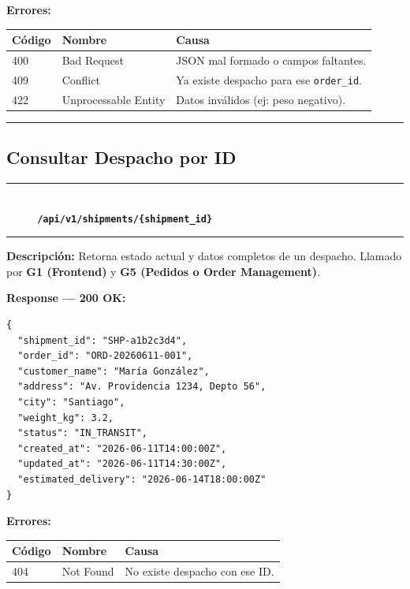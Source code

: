 \documentclass[11pt, a4paper]{article}
\newcommand{\httpmethod}[2]{%
  \colorbox{#1}{\textcolor{white}{\textbf{\small\textsf{#2}}}}%
}
\newcommand{\routeheader}[3]{%
  \noindent\rule{\textwidth}{1.5pt}\\[0.3em]
  \httpmethod{#1}{#2}\;\texttt{\bfseries #3}\\[0.3em]
  \rule{\textwidth}{0.4pt}
  \vspace{0.3cm}
}
\begin{document}
\textbf{Errores:}
\begin{table}[h!]
\small
\begin{tabularx}{\textwidth}{l l X}
  \toprule
  \textbf{Código} & \textbf{Nombre} & \textbf{Causa} \\
  \midrule
  400 & Bad Request          & JSON mal formado o campos faltantes. \\
  409 & Conflict             & Ya existe despacho para ese \texttt{order\_id}. \\
  422 & Unprocessable Entity & Datos inválidos (ej: peso negativo). \\
  \bottomrule
\end{tabularx}
\end{table}

\noindent\rule{\textwidth}{0.4pt}

\subsection{Consultar Despacho por ID}

\routeheader{get}{GET}{/api/v1/shipments/\{shipment\_id\}}

\textbf{Descripción:} Retorna estado actual y datos completos de un despacho.
Llamado por \textbf{G1 (Frontend)} y \textbf{G5 (Pedidos o Order Management)}.

\vspace{0.3cm}
\textbf{Response --- 200 OK:}

\begin{lstlisting}
{
  "shipment_id": "SHP-a1b2c3d4",
  "order_id": "ORD-20260611-001",
  "customer_name": "María González",
  "address": "Av. Providencia 1234, Depto 56",
  "city": "Santiago",
  "weight_kg": 3.2,
  "status": "IN_TRANSIT",
  "created_at": "2026-06-11T14:00:00Z",
  "updated_at": "2026-06-11T14:30:00Z",
  "estimated_delivery": "2026-06-14T18:00:00Z"
}
\end{lstlisting}

\textbf{Errores:}
\begin{table}[h!]
\small
\begin{tabularx}{\textwidth}{l l X}
  \toprule
  \textbf{Código} & \textbf{Nombre} & \textbf{Causa} \\
  \midrule
  404 & Not Found & No existe despacho con ese ID. \\
  \bottomrule
\end{tabularx}
\end{table}
\end{document}

